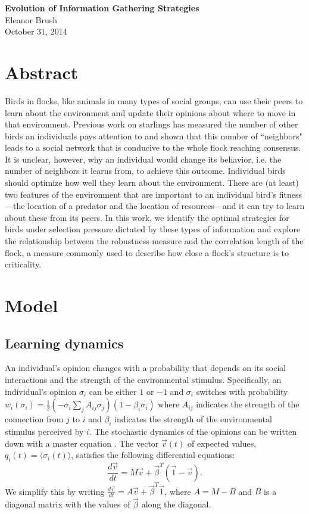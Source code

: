 \documentclass{article}
\begin{document}
\begin{center}
{\bf \LARGE{Evolution of Information Gathering Strategies}}
\vspace{10pt}
\\ Eleanor Brush
\\ October 31, 2014
\end{center}

\tableofcontents

\section{Abstract}
Birds in flocks, like animals in many types of social groups, can use their peers to learn about the environment and update their opinions about where to move in that environment.  Previous work on starlings has measured the number of other birds an individuals pays attention to and shown that this number of ``neighbors" leads to a social network that is conducive to the whole flock reaching consensus.  It is unclear, however, why an individual would change its behavior, i.e. the number of neighbors it learns from, to achieve this outcome.  Individual birds should optimize how well they learn about the environment. There are (at least) two features of the environment that are important to an individual bird's fitness---the location of a predator and the location of resources---and it can try to learn about these from its peers. In this work, we identify the optimal strategies for birds under selection pressure dictated by these types of information and explore the relationship between the robustness measure and the correlation length of the flock, a measure commonly used to describe how close a flock's structure is to criticality.


\section{Model }
\subsection{Learning dynamics }
An individual's opinion changes with a probability that depends on its social interactions and the strength of the environmental stimulus. Specifically, an individual's opinion $\sigma_i$ can be either $1$ or $-1$ and $\sigma_i$ switches with probability $w_i(\sigma_i)=\frac{1}{2}(-\sigma_i\sum_jA_{ij}\sigma_j )(1-\beta_i\sigma_i)$ where $A_{ij}$ indicates the strength of the connection from $j$ to $i$ and $\beta_i$ indicates the strength of the environmental stimulus perceived by $i$.  The stochastic dynamics of the opinions can be written down with a master equation \cite{Glauber:1963fk}.  The vector $\vec{v}(t)$ of expected values, $q_i(t)=\langle \sigma_i(t)\rangle$, satisfies the following differential equations: \cite{Glauber:1963fk}
\begin{equation*}
\frac{d\vec{v}}{dt}=M\vec{v}+\vec{\beta}^T(\vec{1}-\vec{v}).
\end{equation*}
We simplify this by writing $\frac{d\vec{v}}{dt}=A\vec{v}+\vec{\beta}^T\vec{1}$, where $A=M-B$ and $B$ is a diagonal matrix with the values of $\vec{\beta}$ along the diagonal.
\end{document}
